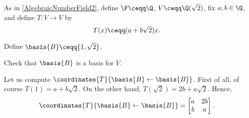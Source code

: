 \begin{exm}{}{}
	As in \cref{AlgebraicNumberField2}, define $\F \ceqq \Q$, $V\ceqq \Q (\sqrt{2})$, fix $a,b\in \Q$, and define $T\colon V\rightarrow V$ by
	\begin{equation}
		T(x)\ceqq (a+b\sqrt{2})x.
	\end{equation}
	
	Define $\basis{B}\ceqq \{ 1,\sqrt{2}\}$.
	\begin{exr}[breakable=false]{}{}
		Check that $\basis{B}$ is a basis for $V$.
	\end{exr}
	Let us compute $\coordinates{T}{\basis{B}\leftarrow \basis{B}}$.  First of all, of course $T(1)=a+b\sqrt{2}$.  On the other hand, $T(\sqrt{2})=2b+a\sqrt{2}$.  Hence,
	\begin{equation}
		\coordinates{T}{\basis{B}\leftarrow \basis{B}}=\begin{bmatrix}a & 2b \\ b & a\end{bmatrix}.
	\end{equation}
\end{exm}


